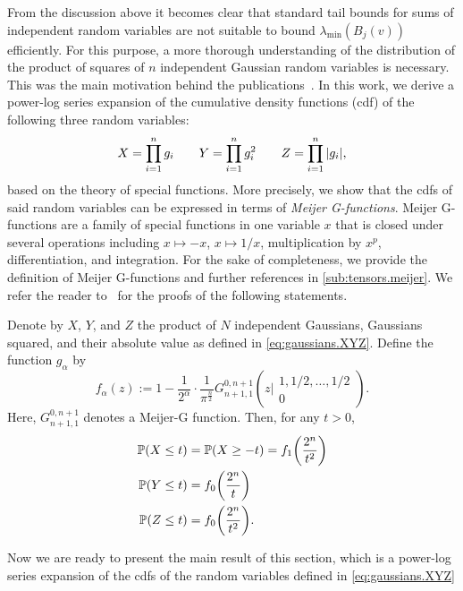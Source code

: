 From the discussion above it becomes clear that standard tail bounds for sums of independent random variables are not suitable to bound $\lambda_\mathrm{min}(B_j(v))$ efficiently.
For this purpose, a more thorough understanding of the distribution of the product of squares of $n$ independent Gaussian random variables is necessary.
This was the main motivation behind the publications~\cite{Stojanac,Stojanac}.
In this work, we derive a power-log series expansion of the cumulative density functions (cdf) of the following three random variables:
\[
  \label{eq:gaussians.XYZ}
  X = \prod_{i=1}^n g_i \quad\quad
  Y = \prod_{i=1}^n g_i^2 \quad\quad
  Z = \prod_{i=1}^n {\left\vert g_i\right\vert},
\]
based on the theory of special functions.
More precisely, we show that the cdfs of said random variables can be expressed in terms of \emph{Meijer G-functions}.
Meijer G-functions are a family of special functions in one variable $x$ that is closed under several operations including $x \mapsto -x$, $x \mapsto 1/x$, multiplication by $x^p$, differentiation, and integration.
For the sake of completeness, we provide the definition of Meijer G-functions and further references in \cref{sub:tensors.meijer}.
We refer the reader to~\cite{Stojanac} for the proofs of the following statements.

\begin{lemma}%
  \label{lem:gaussians.cdf_as_meijer}
  Denote by $X$, $Y$, and $Z$ the product of $N$ independent Gaussians, Gaussians squared, and their absolute value as defined in \cref{eq:gaussians.XYZ}.
  Define the function $g_{\alpha}$ by
  \[\label{eq:gaussians.f_alpha}
    f_{\alpha}(z)
    :=
    1 - \frac{1}{2^{\alpha}} \cdot \frac{1}{\pi^{\frac{n}{2}}}    G_{n+1, 1}^{0,n+1} \left(z \Big|  \begin{matrix} 1,1/2,\ldots,1/2 \\ 0 \end{matrix} \right).
  \]
  Here, $G_{n+1, 1}^{0,n+1}$ denotes a Meijer-G function.
  Then, for any $t> 0$,
  \begin{align}
    \mathbb{P}{\left(X \leq t\right)}&= \mathbb{P}{\left(X \geq -t\right)}  = f_{1}{\left(\frac{2^n}{t^2}\right)} \\
    \mathbb{P}{\left(Y \leq t\right)} &=  f_{0}{\left(\frac{2^n}{t}\right)} \\
    \mathbb{P}{\left(Z \leq t\right)} &= f_{0}{\left(\frac{2^n}{t^2}\right)}.
  \end{align}
\end{lemma}

Now we are ready to present the main result of this section, which is a power-log series expansion of the cdfs of the random variables defined in \cref{eq:gaussians.XYZ}

